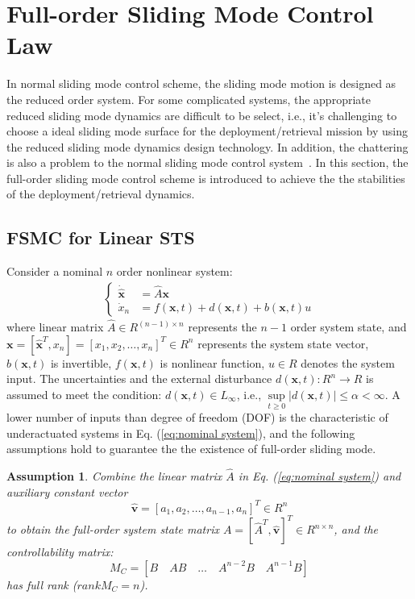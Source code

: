 \documentclass[conference]{IEEEtran}
\theoremstyle{plain}
\newtheorem{myass}{Assumption}
\begin{document}
\section{Full-order Sliding Mode Control Law}\label{sec:control law}
In normal sliding mode control scheme, the sliding mode motion is designed as the reduced order system. For some complicated systems, the appropriate reduced sliding mode dynamics are difficult to be select, i.e., it's challenging to choose a ideal sliding mode surface for the deployment/retrieval mission by using the reduced sliding mode dynamics design technology. In addition, the chattering is also a problem to the normal sliding mode control system~\cite{feng2014chattering}. In this section, the full-order sliding mode control scheme is introduced to achieve the the stabilities of the deployment/retrieval dynamics.
\subsection{FSMC for Linear STS}\label{sec:linear control law}
Consider a nominal $n$ order nonlinear system:
\begin{align}
\begin{cases}
\dot{\hat{\bm{x}}} &= \hat{A}\bm{x}\\
\dot x_n &= f(\bm{x},t) + d(\bm{x},t) + b(\bm{x},t)u\label{eq:nominal system}
\end{cases}
\end{align}
where linear matrix $\hat{A}\in R^{(n-1)\times n}$ represents the $n-1$ order system state, and $\bm{x} = [\hat{\bm{x}}^T,x_n]=[x_1,x_2,\ldots,x_n]^T\in R^n$ represents the system state vector, $b(\bm{x},t)$ is invertible, $f(\bm{x},t)$ is nonlinear function, $u\in R$ denotes the system input. The uncertainties and the external disturbance $d(\bm{x},t): R^n\rightarrow R$ is assumed to meet the condition: $d(\bm{x},t)\in L_{\infty}$, i.e., $\sup\limits_{t\ge 0}\vert d(\bm{x},t)\vert\le\alpha<\infty$. A lower number of inputs than degree of freedom (DOF) is the characteristic of underactuated systems in Eq. (\ref{eq:nominal system}), and the following assumptions hold to guarantee the the existence of full-order sliding mode.\par
\begin{myass}
Combine the linear matrix $\hat{A}$ in Eq. (\ref{eq:nominal system}) and auxiliary constant vector $$\hat{\bm{v}} = [a_1,a_2,\ldots,a_{n-1},a_n]^T\in R^n$$ to obtain the full-order system state matrix $A =[\hat{A}^T,\hat{\bm{v}}]^T\in R^{n \times n}$, and the controllability matrix:
$$
M_C = [B\quad AB\quad \ldots\quad A^{n-2}B\quad A^{n-1}B ]
$$
has full rank ($rank M_C = n$).
\end{myass}
\end{document}
